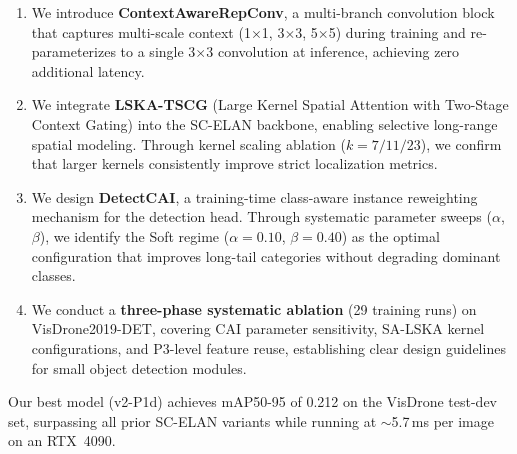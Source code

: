 \begin{enumerate}
  \item We introduce \textbf{ContextAwareRepConv}, a multi-branch convolution block that captures multi-scale context (1$\times$1, 3$\times$3, 5$\times$5) during training and re-parameterizes to a single 3$\times$3 convolution at inference, achieving zero additional latency.
  \item We integrate \textbf{LSKA-TSCG} (Large Kernel Spatial Attention with Two-Stage Context Gating) into the SC-ELAN backbone, enabling selective long-range spatial modeling. Through kernel scaling ablation ($k{=}7/11/23$), we confirm that larger kernels consistently improve strict localization metrics.
  \item We design \textbf{DetectCAI}, a training-time class-aware instance reweighting mechanism for the detection head. Through systematic parameter sweeps ($\alpha$, $\beta$), we identify the Soft regime ($\alpha{=}0.10$, $\beta{=}0.40$) as the optimal configuration that improves long-tail categories without degrading dominant classes.
  \item We conduct a \textbf{three-phase systematic ablation} (29 training runs) on VisDrone2019-DET, covering CAI parameter sensitivity, SA-LSKA kernel configurations, and P3-level feature reuse, establishing clear design guidelines for small object detection modules.
\end{enumerate}

Our best model (v2-P1d) achieves mAP50-95 of 0.212 on the VisDrone test-dev set, surpassing all prior SC-ELAN variants while running at $\sim$5.7\,ms per image on an RTX~4090.
